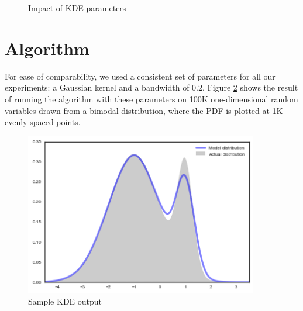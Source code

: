 \documentclass[11pt]{article}
\begin{document}
\begin{figure}[h!]
\centering
{}
\caption{Impact of KDE parameters}
\label{fig:kde_params}
\end{figure}

\newpage

\section{Algorithm}

For ease of comparability, we used a consistent set of parameters for all our experiments: a Gaussian kernel and a bandwidth of $0.2$. Figure \ref{fig:sample_kde} shows the result of running the algorithm with these parameters on 100K one-dimensional random variables drawn from a bimodal distribution, where the PDF is plotted at 1K evenly-spaced points.

\begin{figure}[h!]
\centering
\includegraphics[width=4in]{img/sample_kde.png}
\caption{Sample KDE output}
\label{fig:sample_kde}
\end{figure}
\end{document}
